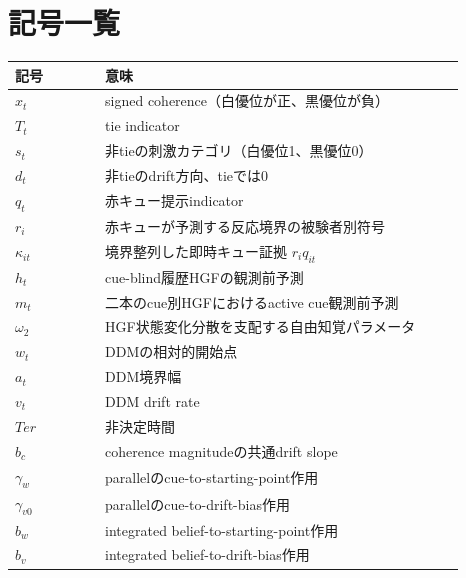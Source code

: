 \documentclass[11pt]{ltjsarticle}
\begin{document}
\section{記号一覧}

\begin{longtable}{p{0.18\linewidth}p{0.72\linewidth}}
\toprule
記号 & 意味 \\
\midrule
\endhead
\(x_t\) & signed coherence（白優位が正、黒優位が負）\\
\(T_t\) & tie indicator\\
\(s_t\) & 非tieの刺激カテゴリ（白優位1、黒優位0）\\
\(d_t\) & 非tieのdrift方向、tieでは0\\
\(q_t\) & 赤キュー提示indicator\\
\(r_i\) & 赤キューが予測する反応境界の被験者別符号\\
\(\kappa_{it}\) & 境界整列した即時キュー証拠 \(r_iq_{it}\)\\
\(h_t\) & cue-blind履歴HGFの観測前予測\\
\(m_t\) & 二本のcue別HGFにおけるactive cue観測前予測\\
\(\omega_2\) & HGF状態変化分散を支配する自由知覚パラメータ\\
\(w_t\) & DDMの相対的開始点\\
\(a_t\) & DDM境界幅\\
\(v_t\) & DDM drift rate\\
\(Ter\) & 非決定時間\\
\(b_c\) & coherence magnitudeの共通drift slope\\
\(\gamma_w\) & parallelのcue-to-starting-point作用\\
\(\gamma_{v0}\) & parallelのcue-to-drift-bias作用\\
\(b_w\) & integrated belief-to-starting-point作用\\
\(b_v\) & integrated belief-to-drift-bias作用\\
\bottomrule
\end{longtable}
\end{document}

